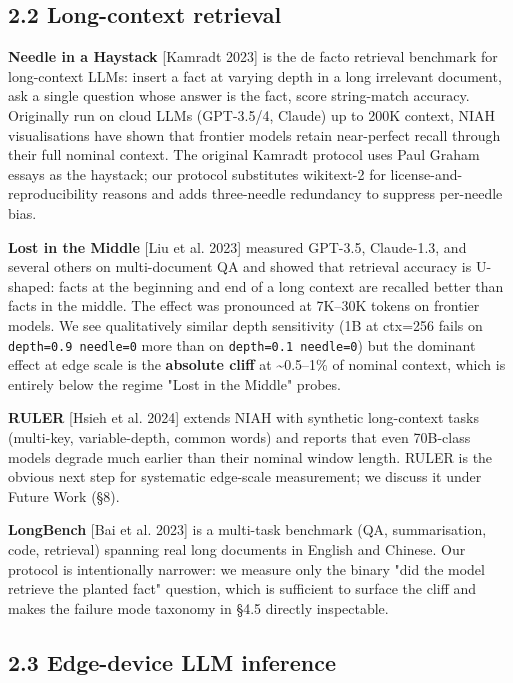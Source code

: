\documentclass[11pt]{article}
\begin{document}
\subsection*{2.2 Long-context retrieval}


\textbf{Needle in a Haystack} [Kamradt 2023] is the de facto retrieval benchmark for long-context LLMs: insert a fact at varying depth in a long irrelevant document, ask a single question whose answer is the fact, score string-match accuracy. Originally run on cloud LLMs (GPT-3.5/4, Claude) up to 200K context, NIAH visualisations have shown that frontier models retain near-perfect recall through their full nominal context. The original Kamradt protocol uses Paul Graham essays as the haystack; our protocol substitutes wikitext-2 for license-and-reproducibility reasons and adds three-needle redundancy to suppress per-needle bias.


\textbf{Lost in the Middle} [Liu et al. 2023] measured GPT-3.5, Claude-1.3, and several others on multi-document QA and showed that retrieval accuracy is U-shaped: facts at the beginning and end of a long context are recalled better than facts in the middle. The effect was pronounced at 7K–30K tokens on frontier models. We see qualitatively similar depth sensitivity (1B at ctx=256 fails on \texttt{depth=0.9 needle=0} more than on \texttt{depth=0.1 needle=0}) but the dominant effect at edge scale is the \textbf{absolute cliff} at \textasciitilde{}0.5–1\% of nominal context, which is entirely below the regime "Lost in the Middle" probes.


\textbf{RULER} [Hsieh et al. 2024] extends NIAH with synthetic long-context tasks (multi-key, variable-depth, common words) and reports that even 70B-class models degrade much earlier than their nominal window length. RULER is the obvious next step for systematic edge-scale measurement; we discuss it under Future Work (§8).


\textbf{LongBench} [Bai et al. 2023] is a multi-task benchmark (QA, summarisation, code, retrieval) spanning real long documents in English and Chinese. Our protocol is intentionally narrower: we measure only the binary "did the model retrieve the planted fact" question, which is sufficient to surface the cliff and makes the failure mode taxonomy in §4.5 directly inspectable.


\subsection*{2.3 Edge-device LLM inference}
\end{document}
